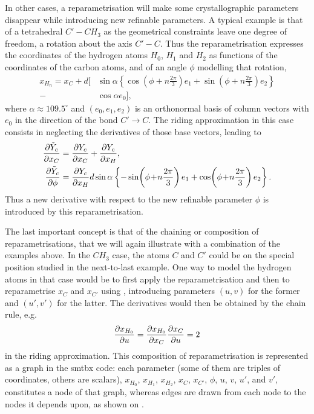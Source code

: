 \documentclass[pdf]{iucr}
\begin{document}
In other cases, a reparametrisation will make some crystallographic parameters disappear while introducing new refinable parameters. A typical example is that of a tetrahedral $C' - CH_3$ as the geometrical constraints leave one degree of freedom, a rotation about the axis $C' - C$. Thus the reparametrisation expresses the coordinates of the hydrogen atoms $H_0$, $H_1$ and $H_2$ as functions of the coordinates of the carbon atoms, and of an angle $\phi$ modelling that rotation,
\newcommand{\hydrogenphiarg}{\!\left(\phi\!+\!n \frac{2\pi}{3}\right)}
\begin{equation}
\begin{split}
x_{H_n} = x_C 
+ d \Biggl[ &\sin \alpha \left\{ \cos\hydrogenphiarg e_1 + \sin\hydrogenphiarg e_2 \right\}\\
- &\cos\alpha e_0
\Biggr],
\end{split}
\label{eqn:rotatingch3reparam}
\end{equation}
where $\alpha \approx 109.5^\circ$ and $(e_0, e_1, e_2)$ is an orthonormal basis of column vectors with $e_0$ in the direction of the bond $C' \rightarrow C$. The riding approximation in this case consists in neglecting the derivatives of those base vectors, leading to
\begin{align}
\partialder{\tilde{Y}_c}{x_C} &= \partialder{Y_c}{x_C} + \partialder{Y_c}{x_H},\\
\partialder{\tilde{Y}_c}{\phi} &= \partialder{Y_c}{x_H} 
d \sin \alpha \left\{ -\sin\hydrogenphiarg e_1 + \cos\hydrogenphiarg e_2 \right\}.
\end{align}
Thus a new derivative with respect to the new refinable parameter $\phi$ is introduced by this reparametrisation.

The last important concept is that of the chaining or composition of reparametrisations, that we will again illustrate with a combination of the examples above. In the $CH_3$ case, the atoms $C$ and $C'$ could be on the special position studied in the next-to-last example. One way to model the hydrogen atoms in that case would be to first apply the reparametrisation  and then to reparametrise $x_C$ and $x_{C'}$ using , introducing parameters $(u,v)$ for the former and $(u',v')$ for the latter. The derivatives would then be obtained by the chain rule, e.g.
\begin{equation}
\frac{\partial x_{H_0}}{\partial u} = \frac{\partial x_{H_0}}{\partial x_C}\frac{\partial x_C}{\partial u} = 2
\end{equation}
in the riding approximation. This composition of reparametrisation is represented as a graph in the smtbx code: each parameter (some of them are triples of coordinates, others are scalars), $x_{H_0}$, $x_{H_1}$, $x_{H_2}$, $x_C$, $x_{C'}$, $\phi$, $u$, $v$, $u'$, and $v'$, constitutes a node of that graph, whereas edges are drawn from each node to the nodes it depends upon, as shown on . 
\end{document}
